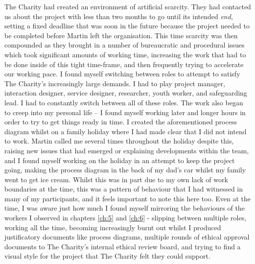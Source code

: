 The Charity had created an environment of artificial scarcity. They had contacted us about the project with less than two months to go until its intended \textit{end}, setting a fixed deadline that was soon in the future because the project needed to be completed before Martin left the organisation. This time scarcity was then compounded as they brought in a number of bureaucratic and procedural issues which took significant amounts of working time, increasing the work that had to be done inside of this tight time-frame, and then frequently trying to accelerate our working pace.  I found myself switching between roles to attempt to satisfy The Charity’s increasingly large demands. I had to play project manager, interaction designer, service designer, researcher, youth worker, and safeguarding lead. I had to constantly switch between all of these roles. The work also began to creep into my personal life – I found myself working later and longer hours in order to try to get things ready in time. I created the aforementioned process diagram whilst on a family holiday where I had made clear that I did not intend to work. Martin called me several times throughout the holiday despite this, raising new issues that had emerged or explaining developments within the team, and I found myself working on the holiday in an attempt to keep the project going, making the process diagram in the back of my dad's car whilst my family went to get ice cream. Whilst this was in part due to my own lack of work boundaries at the time, this was a pattern of behaviour that I had witnessed in many of my participants, and it feels important to note this here too. Even at the time, I was aware just how much I found myself mirroring the behaviours of the workers I observed in chapters \ref{ch:5} and \ref{ch:6} - slipping between multiple roles, working all the time, becoming increasingly burnt out whilst I produced justificatory documents like process diagrams, multiple rounds of ethical approval documents to The Charity's internal ethical review board, and trying to find a visual style for the project that The Charity felt they could support. 

